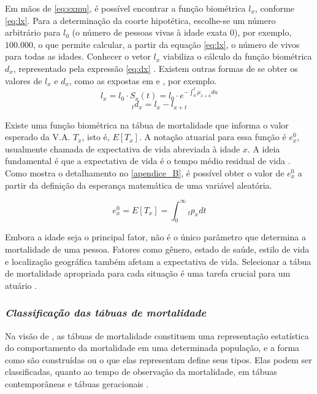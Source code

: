 Em mãos de \ref{eq:sxmu}, é possível encontrar a função biométrica $l_x$, conforme \ref{eq:lx}. Para a determinação da coorte hipotética, escolhe-se um número arbitrário para $l_0$ (o número de pessoas vivas à idade exata 0), por exemplo, $100.000$, o que permite calcular, a partir da equação \ref{eq:lx}, o número de vivos para todas as idades. Conhecer o vetor $l_x$ viabiliza o cálculo da função biométrica $d_x$, representado pela expressão \ref{eq:dx} \cite{bowers2006, macdonald2018}. Existem outras formas de se obter os valores de $l_x$ e $d_x$, como as expostas em  e , por exemplo.
\begin{equation}
    l_x=l_0\cdot S_x(t)=l_0 \cdot e^{-\int_0^t\mu_{x+u}du}
    \label{eq:lx}
\end{equation}
\begin{equation}
    {}_td_x=l_x-l_{x+t}
    \label{eq:dx}
\end{equation}

Existe uma função biométrica na tábua de mortalidade que informa o valor esperado da V.A. $T_x$, isto é, $E[T_x]$. A notação atuarial para essa função é $e_x^0$, usualmente chamada de expectativa de vida abreviada à idade $x$. A ideia fundamental é que a expectativa de vida é o tempo médio residual de vida \cite{promislow2015}. Como mostra o detalhamento no \ref{apendice_B}, é possível obter o valor de $e_x^0$ a partir da definição da esperança matemática de uma variável aleatória.

\begin{equation}
    e_x^0=E[T_x]=\int_0^\infty {}_tp_xdt
    \label{eq:ex}
\end{equation}

Embora a idade seja o principal fator, não é o único parâmetro que determina a mortalidade de uma pessoa. Fatores como gênero, estado de saúde, estilo de vida e localização geográfica também afetam a expectativa de vida. Selecionar a tábua de mortalidade apropriada para cada situação é uma tarefa crucial para um atuário \cite{promislow2015}.

\subsubsection{\textit{Classificação das tábuas de mortalidade}}

Na visão de , as tábuas de mortalidade constituem uma representação estatística do comportamento da mortalidade em uma determinada população, e a forma como são construídas ou o que elas representam define seus tipos. Elas podem ser classificadas, quanto ao tempo de observação da mortalidade, em tábuas contemporâneas e tábuas geracionais \cite{bravo2007, ortega1987}.

